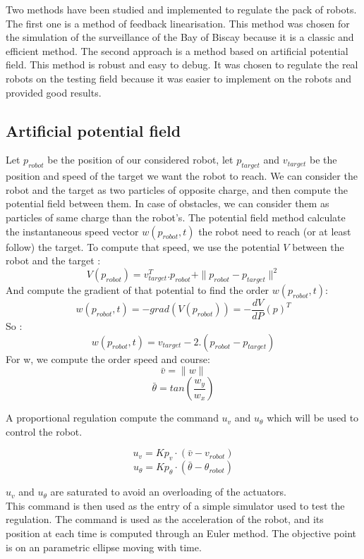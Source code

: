 Two methods have been studied and implemented to regulate the pack of robots. The first one is a method of feedback linearisation. This method was chosen for the simulation of the surveillance of the Bay of Biscay because it is a classic and efficient method. The second approach is a method based on artificial potential field. This method is robust and easy to debug. It was chosen to regulate the real robots on the testing field because it was easier to implement on the robots and provided good results.

\subsection{Artificial potential field}
Let $p_{robot}$ be the position of our considered robot, let $p_{target}$ and $v_{target}$ be the position and speed of the target we want the robot to reach.
We can consider the robot and the target as two particles of opposite charge, and then compute the potential field between them. In case of obstacles, we can consider them as particles of same charge than the robot's.
The potential field method calculate the instantaneous speed vector $w(p_{robot},t)$ the robot need to reach (or at least follow) the target. To compute that speed, we use the potential $V$ between the robot and the target :\\
\[ V(p_{robot}) = v^T_{target}. p_{robot} + \|p_{robot}-p_{target}\|^2 \]
And compute the gradient of that potential to find the order $w(p_{robot},t)$:
\[w(p_{robot},t) = -grad(V(p_{robot})) = -\frac{dV}{dP}(p)^T\]
So :
\[w(p_{robot},t) = v_{target}-2.(p_{robot}-p_{target})\]
For w, we compute the order speed and course:
\[\bar{v} = \|w\| \]
\[\bar{\theta} = tan(\frac{w_y}{w_x})\]

A proportional regulation compute the command $u_v$ and $u_{\theta}$ which will be used to control the robot.

\[ u_v = Kp_v \cdot (\bar{v}-v_{robot}) \]
\[ u_{\theta} = Kp_{\theta} \cdot (\bar{\theta}-\theta_{robot}) \]

$u_v$ and $u_{\theta}$ are saturated to avoid an overloading of the actuators.\\

This command is then used as the entry of a simple simulator used to test the regulation.
The command is used as the acceleration of the robot, and its position at each time is computed through an Euler method. The objective point is on an parametric ellipse moving with time.\\

